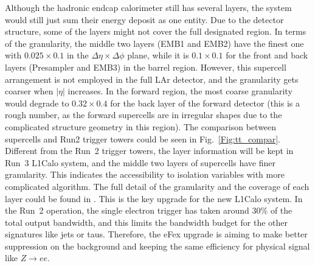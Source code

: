 Although the hadronic endcap calorimeter still has several layers, the system would still just sum their energy deposit as one entity. Due to the detector structure, some of the layers might not cover the full designated region. In terms of the granularity, the middle two layers (EMB1 and EMB2) have the finest one with $0.025\times 0.1$ in the $\Delta\eta\times\Delta\phi$ plane, while it is $0.1\times0.1$ for the front and back layers (Presampler and EMB3) in the barrel region. However, this supercell arrangement is not employed in the full LAr detector, and the granularity gets coarser when $|\eta|$ increases. In the forward region, the most coarse granularity would degrade to $0.32\times0.4$ for the back layer of the forward detector (this is a rough number, as the forward supercells are in irregular shapes due to the complicated structure geometry in this region). The comparison between supercells and Run2 trigger towers could be seen in Fig.~\ref{Fig:tt_compar}. Different from the Run~2 trigger towers, the layer information will be kept in Run~3 L1Calo system, and the middle two layers of supercells have finer granularity. This indicates the accessibility to isolation variables with more complicated algorithm. The full detail of the granularity and the coverage of each layer could be found in \cite{Aleksa:1602230}. This is the key upgrade for the new L1Calo system. In the Run~2 operation, the single electron trigger has taken around $30\%$ of the total output bandwidth, and this limits the bandwidth budget for the other signatures like jets or taus. Therefore, the eFex upgrade is aiming to make better suppression on the background and keeping the same efficiency for physical signal like $Z\to ee$. 
